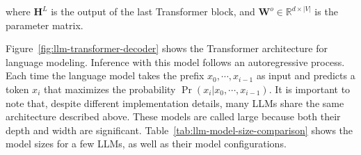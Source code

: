 \noindent where $\mathbf{H}^{L}$ is the output of the last Transformer block, and $\mathbf{W}^{o} \in \mathbb{R}^{d \times |V|}$ is the parameter matrix.

Figure~\ref{fig:llm-transformer-decoder} shows the Transformer architecture for language modeling. Inference with this model follows an autoregressive process. Each time the language model takes the prefix $x_0,\cdots,x_{i-1}$ as input and predicts a token $x_{i}$ that maximizes the probability $\Pr(x_i|x_0,\cdots,x_{i-1})$. It is important to note that, despite different implementation details, many LLMs share the same architecture described above. These models are called large because both their depth and width are significant. Table~\ref{tab:llm-model-size-comparison} shows the model sizes for a few LLMs, as well as their model configurations.

